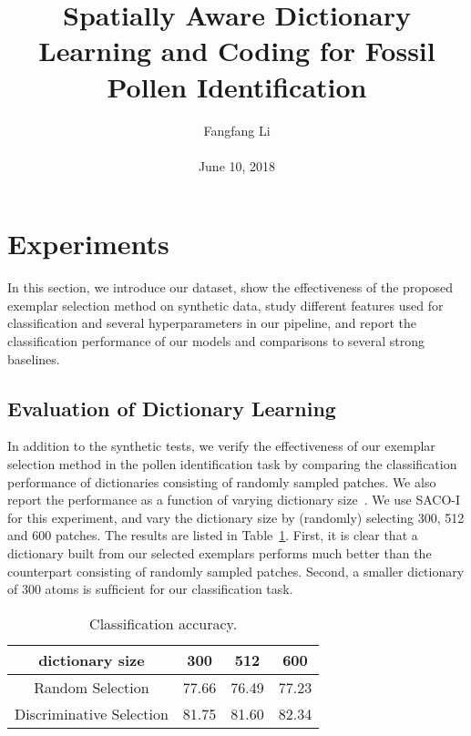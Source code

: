 \documentclass[10pt,twocolumn,letterpaper]{article}
\begin{document}
\title{\textbf{Spatially Aware Dictionary Learning and Coding for Fossil Pollen Identification }}
\author{Fangfang Li\\\\June 10, 2018}

\maketitle


\section{Experiments}

In this section, we introduce our dataset, show the effectiveness of the proposed exemplar selection method on synthetic data, study different features used for classiﬁcation and several hyperparameters in our pipeline, and report the classiﬁcation performance of our models and comparisons to several strong baselines.
\subsection{Evaluation of Dictionary Learning}

In addition to the synthetic tests, we verify the effectiveness of our exemplar selection method in the pollen identiﬁcation task by comparing the classiﬁcation performance of dictionaries consisting of randomly sampled patches. We also report the performance as a function of varying dictionary size~\cite{fikes1971strips}.
We use SACO-I for this experiment, and vary the dictionary size by (randomly) selecting 300, 512 and 600 patches. The results are listed in Table~\ref{table1}. First, it is clear that a dictionary built from our selected exemplars performs much better than the counterpart consisting of randomly sampled patches. Second, a smaller dictionary of 300 atoms is sufﬁcient for our classiﬁcation task.

\begin{table}[!htb]
\centering
\caption{Classiﬁcation accuracy.}

\label{table1}

\begin{tabular}{|c|c|c|c|}
\hline
dictionary size & 300& 512 &600\\
\hline
Random Selection &77.66	&76.49	&77.23 \\
\hline
Discriminative Selection& 81.75&81.60& 82.34\\

\hline
\end{tabular}


\end{table}
\end{document}
